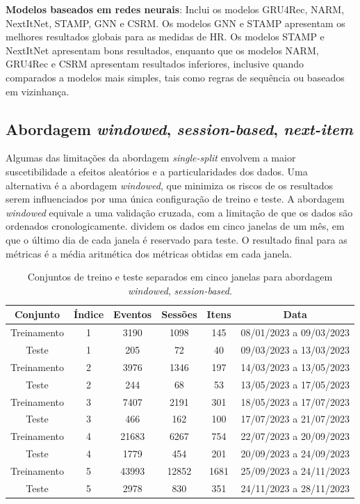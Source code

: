 \textbf{Modelos baseados em redes neurais}: Inclui os modelos GRU4Rec, NARM, NextItNet, STAMP, GNN e CSRM. Os modelos GNN e
STAMP apresentam os melhores resultados globais para as medidas de HR. Os
modelos STAMP e NextItNet apresentam bons resultados, enquanto que os modelos
NARM, GRU4Rec e CSRM apresentam resultados inferiores, inclusive quando comparados
a modelos mais simples, tais como regras de sequência ou baseados em vizinhança.


\subsection{Abordagem \textit{windowed}, \textit{session-based}, \textit{next-item}}
Algumas das limitações da abordagem \textit{single-split} envolvem a maior
suscetibilidade a efeitos aleatórios e a particularidades dos dados. Uma
alternativa é a abordagem \textit{windowed}, que minimiza os riscos de os
resultados serem influenciados por uma única configuração de treino e teste. A
abordagem \textit{windowed} equivale a uma validação cruzada, com a limitação de
que os dados são ordenados cronologicamente. \citet{ludewig_2018} dividem os
dados em cinco janelas de um mês, em que o último dia de cada janela é reservado
para teste. O resultado final para as métricas é a média aritmética dos
métricas obtidas em cada janela.


\begin{table}[htbp]
  \centering
  \begin{tabular}{|c|c|c|c|c|c|}
    \hline
    Conjunto & Índice & Eventos & Sessões & Itens & Data\\
    \hline
    Treinamento & 1 & 3190 & 1098 & 145 & 08/01/2023 a 09/03/2023\\
    \hline
    Teste & 1 & 205 & 72 & 40 & 09/03/2023 a 13/03/2023\\
    \hline
    Treinamento & 2 & 3976 & 1346 & 197 & 14/03/2023 a 13/05/2023\\
    \hline
    Teste & 2 & 244 & 68 & 53 & 13/05/2023 a 17/05/2023\\
    \hline
    Treinamento & 3 & 7407 & 2191 & 301 & 18/05/2023 a 17/07/2023\\
    \hline
    Teste & 3 & 466 & 162 & 100 & 17/07/2023 a 21/07/2023\\
    \hline
    Treinamento & 4 & 21683 & 6267 & 754 & 22/07/2023 a 20/09/2023\\
    \hline
    Teste & 4 & 1779 & 454 & 201 & 20/09/2023 a 24/09/2023\\
    \hline
    Treinamento & 5 & 43993 & 12852 & 1681 & 25/09/2023 a 24/11/2023\\
    \hline
    Teste & 5 & 2978 & 830 & 351 & 24/11/2023 a 28/11/2023\\
    \hline
  \end{tabular}
  \caption{Conjuntos de treino e teste separados em cinco janelas para abordagem \textit{windowed}, \textit{session-based}.}
  \label{tab:windowed_data}
\end{table}

